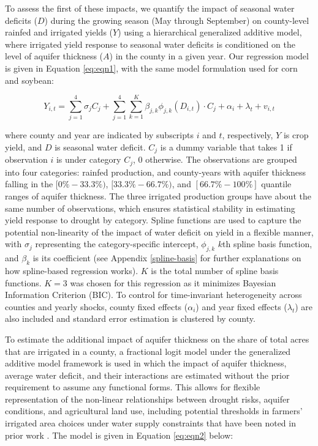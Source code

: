 \documentclass[
]{article}
\begin{document}
To assess the first of these impacts, we quantify the impact of seasonal water deficits (\(D\)) during the growing season (May through September) on county-level rainfed and irrigated yields (\(Y\)) using a hierarchical generalized additive model, where irrigated yield response to seasonal water deficits is conditioned on the level of aquifer thickness (\(A\)) in the county in a given year. Our regression model is given in Equation \eqref{eq:eqn1}, with the same model formulation used for corn and soybean:

\begin{equation}
Y_{i,t} = \sum_{j=1}^4 \sigma_j C_j + \sum_{j=1}^4 \sum_{k=1}^K \beta_{j,k}\phi_{j,k}(D_{i,t})\cdot C_j  + \alpha_i + \lambda_t + v_{i,t} \label{eq:eqn1}
\end{equation}

where county and year are indicated by subscripts \(i\) and \(t\), respectively, \(Y\) is crop yield, and \(D\) is seasonal water deficit. \(C_j\) is a dummy variable that takes 1 if observation \(i\) is under category \(C_j\), 0 otherwise. The observations are grouped into four categories: rainfed production, and county-years with aquifer thickness falling in the \([0\%-33.3\%)\), \([33.3\%-66.7\%)\), and \([66.7\% - 100\%]\) quantile ranges of aquifer thickness. The three irrigated production groups have about the same number of observations, which ensures statistical stability in estimating yield response to drought by category. Spline functions are used to capture the potential non-linearity of the impact of water deficit on yield in a flexible manner, with \(\sigma_j\) representing the category-specific intercept, \(\phi_{j,k}\) \(k\)th spline basis function, and \(\beta_k\) is its coefficient (see Appendix \ref{spline-basis} for further explanations on how spline-based regression works). $K$ is the total number of spline basis functions. $K = 3$ was chosen for this regression as it minimizes Bayesian Information Criterion (BIC). To control for time-invariant heterogeneity across counties and yearly shocks, county fixed effects (\(\alpha_i\)) and year fixed effects (\(\lambda_t\)) are also included and standard error estimation is clustered by county.

To estimate the additional impact of aquifer thickness on the share of total acres that are irrigated in a county, a fractional logit model under the generalized additive model framework is used in which the impact of aquifer thickness, average water deficit, and their interactions are estimated without the prior requirement to assume any functional forms. This allows for flexible representation of the non-linear relationships between drought risks, aquifer conditions, and agricultural land use, including potential thresholds in farmers' irrigated area choices under water supply constraints that have been noted in prior work \citep{foster2015well, foster2015analysis, hrozencik2017heterogeneous}. The model is given in Equation \eqref{eq:eqn2} below:
\end{document}
